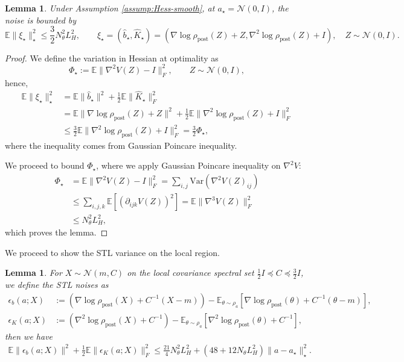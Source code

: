 \documentclass[11pt]{article}
\theoremstyle{plain}
\newtheorem{lemma}[theorem]{Lemma}
\theoremstyle{definition}
\theoremstyle{remark}
\newcommand{\N}{\mathcal{N}}
\newcommand{\E}{\mathbb{E}}
\newcommand{\post}{\mathrm{post}}
\begin{document}
\begin{lemma}\label{lem:STL-noise-bound}
    Under Assumption \ref{assump:Hess-smooth}, at $a_\star = \N(0, I)$, the noise is bounded by
    \begin{equation*}
        \E \|\xi_\star\|_\star^2 \le \frac{3}{2} N_\theta^2 L_H^2, \qquad \xi_\star = (\hat b_\star, \widehat K_\star) = (\nabla \log \rho_\post (Z) + Z, \nabla^2 \log \rho_\post (Z) + I), \quad Z\sim \N(0, I).
    \end{equation*}
\end{lemma}

\begin{proof}
    We define the variation in Hessian at optimality as
    \begin{equation*}
        \Phi_\star := \E \| \nabla^2 V(Z) - I \|_F^2, \qquad Z \sim \N (0, I),
    \end{equation*}
    hence,
    \begin{align*}
        \E \|\xi_\star\|_\star^2 &= \E \| \hat b_\star \|^2 + \frac{1}{2} \E \| \widehat K_\star \|_F^2 \\
        &= \E \| \nabla \log \rho_\post (Z) + Z\|^2 + \frac{1}{2} \E \| \nabla^2 \log \rho_\post (Z) + I \|_F^2\\
        &\leq \frac{3}{2} \E \| \nabla^2 \log \rho_\post (Z) + I \|_F^2 = \frac{3}{2} \Phi_\star,
    \end{align*}
    where the inequality comes from Gaussian Poincare inequality.

    We proceed to bound $\Phi_\star$, where we apply Gaussian Poincare inequality on $\nabla^2 V$:
    \begin{align*}
        \Phi_\star &= \E \| \nabla^2 V(Z) - I \|_F^2 = \sum_{i, j} \mathrm{Var} (\nabla^2 V(Z)_{ij}) \\
        &\leq \sum_{i, j, k} \E[ (\partial_{ijk} V(Z))^2] = \E \| \nabla^3 V(Z) \|_F^2 \\
        &\leq N_\theta^2 L_H^2,
    \end{align*}
    which proves the lemma.
\end{proof}

We proceed to show the STL variance on the local region.

\begin{lemma}\label{lem:STL-loc-var}
    For $X \sim \N (m, C)$ on the local covariance spectral set $\frac{1}{2} I \preceq C \preceq \frac{3}{2} I$, we define the STL noises as
    \begin{align*}
        \epsilon_b (a; X) &:= (\nabla \log \rho_\post (X) + C^{-1} (X - m)) - \E_{\theta \sim \rho_a} [\nabla \log \rho_\post (\theta) + C^{-1} (\theta - m)], \\
        \epsilon_K (a; X) &:= (\nabla^2 \log \rho_\post (X) + C^{-1}) - \E_{\theta \sim \rho_a} [\nabla^2 \log \rho_\post (\theta) + C^{-1}],
    \end{align*}
    then we have
    \begin{align*}
        \E \| \epsilon_b (a; X) \|^2 + \frac{1}{2} \E \| \epsilon_K (a; X) \|_F^2 \leq \frac{21}{4} N_\theta^2 L_H^2 + (48 + 12 N_\theta L_H^2) \|a - a_\star \|_\star^2.
    \end{align*}
\end{lemma}
\end{document}
